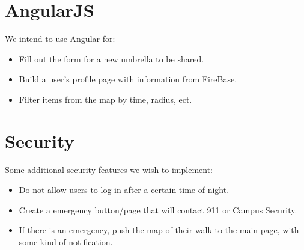 \documentclass[11pt,letterpaper]{article}
\begin{document}
\section*{AngularJS	}
We intend to use Angular for:
\begin{itemize}
\item Fill out the form for a new umbrella to be shared.
\item Build a user's profile page with information from FireBase.
\item Filter items from the map by time, radius, ect.
\end{itemize}

\section*{Security}
Some additional security features we wish to implement:
\begin{itemize}
\item Do not allow users to log in after a certain time of night.
\item Create a emergency button/page that will contact 911 or Campus Security.
\item If there is an emergency, push the map of their walk to the main page, with some kind of notification.
\end{itemize}
\end{document}
